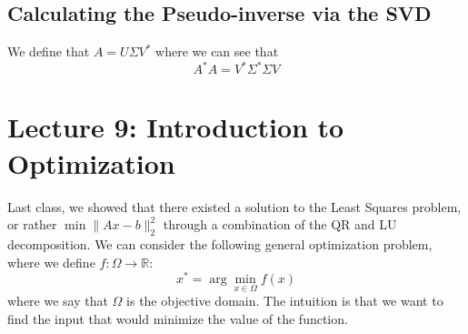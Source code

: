 \documentclass[11pt]{article}
\theoremstyle{definition}
\newcommand{\R}{\mathbb{R}}
\begin{document}
\subsection{Calculating the Pseudo-inverse via the SVD}
We define that $A = U \Sigma V^*$ where we can see that 
\[
A^* A = V^* \Sigma^* \Sigma V 
\]

\section{Lecture 9: Introduction to Optimization}
Last class, we showed that there existed a solution to the Least Squares problem, or rather $\min \|Ax - b\|^2_2$ through a combination of the QR and LU decomposition. We can consider the following general optimization problem, where we define $f: \Omega \to \R$:
\[
x^* = \arg \min_{x \in \Omega} f(x)
\]
where we say that $\Omega$ is the objective domain. The intuition is that we want to find the input that would minimize the value of the function. 
\end{document}
